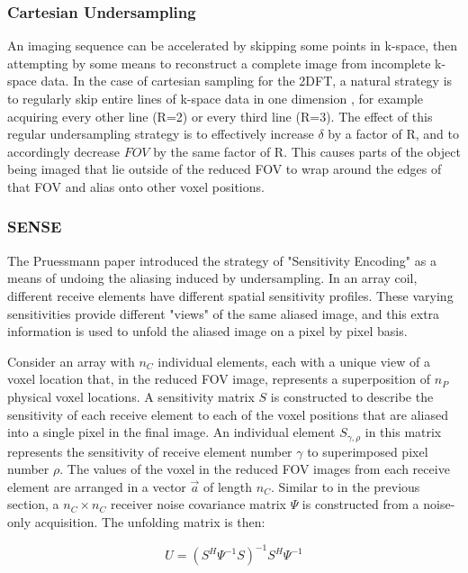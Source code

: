 \subsubsection{Cartesian Undersampling}
An imaging sequence can be accelerated by skipping some points in k-space, then attempting by some means to reconstruct
a complete image from incomplete k-space data. In the case of cartesian sampling for the 2DFT, a natural strategy is to
regularly skip entire lines of k-space data in one dimension \cite{Pruessmann1999}, for example acquiring every other
line (R=2) or every third line (R=3). The effect of this regular undersampling strategy is to effectively increase
$\delta$ by a factor of R, and to accordingly decrease $FOV$ by the same factor of R. This causes parts of the object
being imaged that lie outside of the reduced FOV to wrap around the edges of that FOV and alias onto other voxel
positions.

\subsubsection{SENSE}
The Pruessmann paper \cite{Pruessmann1999} introduced the strategy of "Sensitivity Encoding" as a means of undoing the
aliasing induced by undersampling. In an array coil, different receive elements have different spatial sensitivity
profiles. These varying sensitivities provide different "views" of the same aliased image, and this extra information is
used to unfold the aliased image on a pixel by pixel basis.

Consider an array with $n_C$ individual elements, each with a unique view of a voxel location that, in the reduced FOV
image, represents a superposition of $n_P$ physical voxel locations. A sensitivity matrix $S$ is constructed to describe
the sensitivity of each receive element to each of the voxel positions that are aliased into a single pixel in the final
image. An individual element $S_{\gamma,\rho}$ in this matrix represents the sensitivity of receive element number
$\gamma$ to superimposed pixel number $\rho$. The values of the voxel in the reduced FOV images from each receive
element are arranged in a vector $\vec{a}$ of length $n_C$. Similar to in the previous section, a $n_C \times n_C$
receiver noise covariance matrix $\Psi$ is constructed from a noise-only acquisition. The unfolding matrix is then:

\begin{equation}\label{eq:unfolding}
    U = (S^H\Psi^{-1}S)^{-1}S^H\Psi^{-1}
\end{equation}

